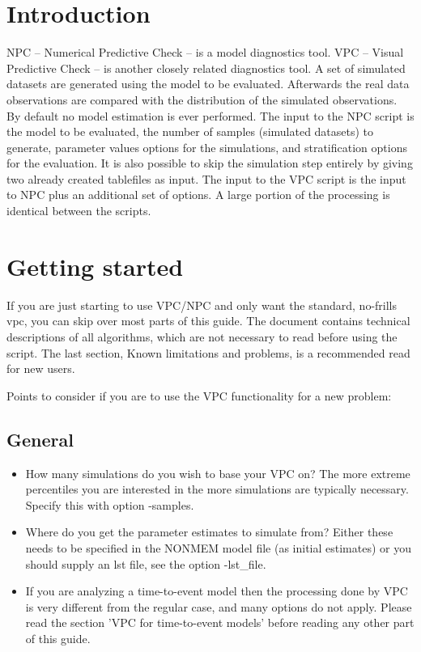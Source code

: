 




\maketitle

\section{Introduction}
NPC – Numerical Predictive Check – is a model diagnostics tool. VPC – Visual Predictive Check – is another closely related diagnostics tool. A set of simulated datasets are generated using the model to be evaluated. Afterwards the real data observations are compared with the distribution of the simulated observations. By default no model estimation is ever performed. The input to the NPC script is the model to be evaluated, the number of samples (simulated datasets) to generate, parameter values options for the simulations, and stratification options for the evaluation. It is also possible to skip the simulation step entirely by giving two already created tablefiles as input. The input to the VPC script is the input to NPC plus an additional set of options. A large portion of the processing is identical between the scripts.

\section{Getting started}
If you are just starting to use VPC/NPC and only want the standard, no-frills vpc, you can skip over most parts of this guide. The document contains technical descriptions of all algorithms, which are not necessary to read before using the script. The last section, Known limitations and problems, is a recommended read for new users.

Points to consider if you are to use the VPC functionality for a new problem:

\subsection{General}

\begin{itemize}
	\item How many simulations do you wish to base your VPC on? The more extreme percentiles you are interested in the more simulations are typically necessary. Specify this with option -samples.
	\item Where do you get the parameter estimates to simulate from? Either these needs to be specified in the NONMEM model file (as initial estimates) or you should supply an lst file, see the option -lst\_file.
	\item If you are analyzing a time-to-event model then the processing done by VPC is very different from the regular case, and many options do not apply. Please read the section 'VPC for time-to-event models' before reading any other part of this guide.
\end{itemize}

